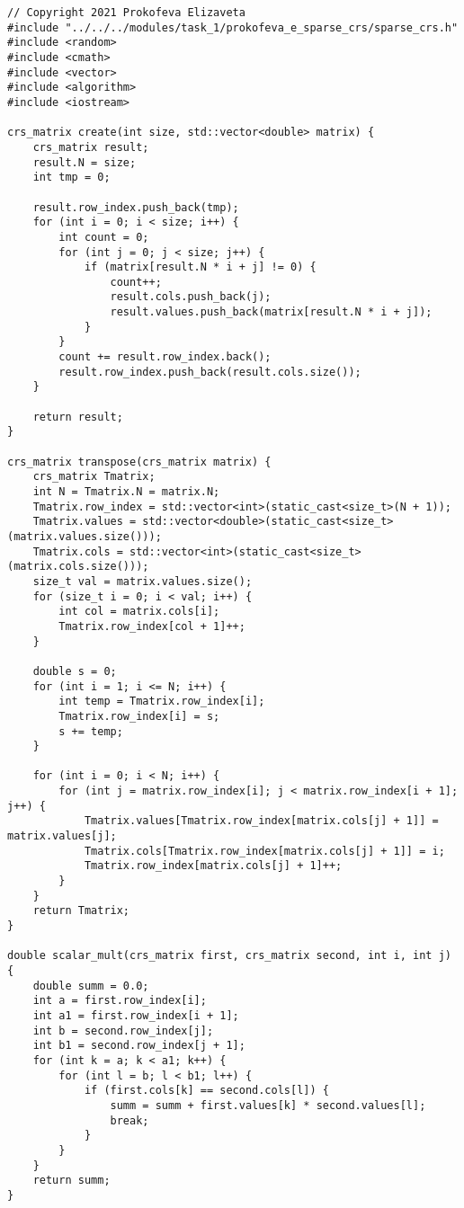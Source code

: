 \documentclass{report}
\begin{document}
\begin{lstlisting}
// Copyright 2021 Prokofeva Elizaveta
#include "../../../modules/task_1/prokofeva_e_sparse_crs/sparse_crs.h"
#include <random>
#include <cmath>
#include <vector>
#include <algorithm>
#include <iostream>

crs_matrix create(int size, std::vector<double> matrix) {
    crs_matrix result;
    result.N = size;
    int tmp = 0;

    result.row_index.push_back(tmp);
    for (int i = 0; i < size; i++) {
        int count = 0;
        for (int j = 0; j < size; j++) {
            if (matrix[result.N * i + j] != 0) {
                count++;
                result.cols.push_back(j);
                result.values.push_back(matrix[result.N * i + j]);
            }
        }
        count += result.row_index.back();
        result.row_index.push_back(result.cols.size());
    }

    return result;
}

crs_matrix transpose(crs_matrix matrix) {
    crs_matrix Tmatrix;
    int N = Tmatrix.N = matrix.N;
    Tmatrix.row_index = std::vector<int>(static_cast<size_t>(N + 1));
    Tmatrix.values = std::vector<double>(static_cast<size_t>(matrix.values.size()));
    Tmatrix.cols = std::vector<int>(static_cast<size_t>(matrix.cols.size()));
    size_t val = matrix.values.size();
    for (size_t i = 0; i < val; i++) {
        int col = matrix.cols[i];
        Tmatrix.row_index[col + 1]++;
    }

    double s = 0;
    for (int i = 1; i <= N; i++) {
        int temp = Tmatrix.row_index[i];
        Tmatrix.row_index[i] = s;
        s += temp;
    }

    for (int i = 0; i < N; i++) {
        for (int j = matrix.row_index[i]; j < matrix.row_index[i + 1]; j++) {
            Tmatrix.values[Tmatrix.row_index[matrix.cols[j] + 1]] = matrix.values[j];
            Tmatrix.cols[Tmatrix.row_index[matrix.cols[j] + 1]] = i;
            Tmatrix.row_index[matrix.cols[j] + 1]++;
        }
    }
    return Tmatrix;
}

double scalar_mult(crs_matrix first, crs_matrix second, int i, int j) {
    double summ = 0.0;
    int a = first.row_index[i];
    int a1 = first.row_index[i + 1];
    int b = second.row_index[j];
    int b1 = second.row_index[j + 1];
    for (int k = a; k < a1; k++) {
        for (int l = b; l < b1; l++) {
            if (first.cols[k] == second.cols[l]) {
                summ = summ + first.values[k] * second.values[l];
                break;
            }
        }
    }
    return summ;
}


\end{lstlisting}
\end{document}
